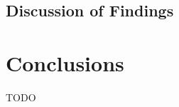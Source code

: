\documentclass[10pt, conference]{IEEEtran}
\begin{document}
\subsection{Discussion of Findings}

\section{Conclusions}
TODO



\end{document}
